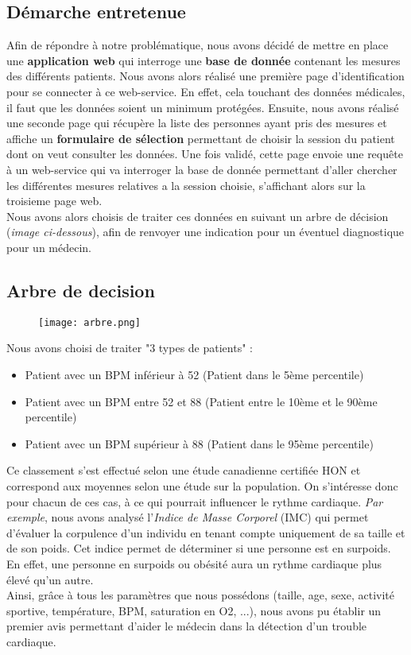 	\subsection{Démarche entretenue}
Afin de répondre à notre problématique, nous avons décidé de mettre en place une \textbf{application web} qui interroge une \textbf{base de donnée} contenant les mesures des différents patients. 
Nous avons alors réalisé une première page d'identification pour se connecter à ce web-service. 
En effet, cela touchant des données médicales, il faut que les données soient un minimum protégées. 
Ensuite, nous avons réalisé une seconde page qui récupère la liste des personnes ayant pris des mesures et affiche un \textbf{formulaire de sélection} permettant de choisir la session du patient dont on veut consulter les données. 
Une fois validé, cette page envoie une requête à un web-service qui va interroger la base de donnée permettant d'aller chercher les différentes mesures relatives a la session choisie, s'affichant alors sur la troisieme page web. \\
Nous avons alors choisis de traiter ces données en suivant un arbre de décision (\textit{image ci-dessous}), afin de renvoyer une indication pour un éventuel diagnostique pour un médecin. 


	\subsection{Arbre de decision}
\begin{figure}[h]
    \centerline{\texttt{[image: arbre.png]}}
\end{figure}
\newpage

Nous avons choisi de traiter "3 types de patients" :
\begin{itemize}
\item Patient avec un BPM inférieur à 52 (Patient dans le 5ème percentile)
\item Patient avec un BPM entre 52 et 88 (Patient entre le 10ème et le 90ème percentile)
\item Patient avec un BPM supérieur à 88 (Patient dans le 95ème percentile)
\end{itemize} 
Ce classement s'est effectué selon une étude canadienne certifiée HON et correspond aux moyennes selon une étude sur la population.
On s'intéresse donc pour chacun de ces cas, à ce qui pourrait influencer le rythme cardiaque.
\textit{Par exemple}, nous avons analysé l'\textit{Indice de Masse Corporel} (IMC) qui permet d'évaluer la corpulence d'un individu en tenant compte uniquement de sa taille et de son poids. Cet indice permet de déterminer si une personne est en surpoids. En effet, une personne en surpoids ou obésité aura un rythme cardiaque plus élevé qu'un autre.
\\
Ainsi, grâce à tous les paramètres que nous possédons (taille, age, sexe, activité sportive, température, BPM, saturation en O2, ...), nous avons pu établir un premier avis permettant d'aider le médecin dans la détection d'un trouble cardiaque.
